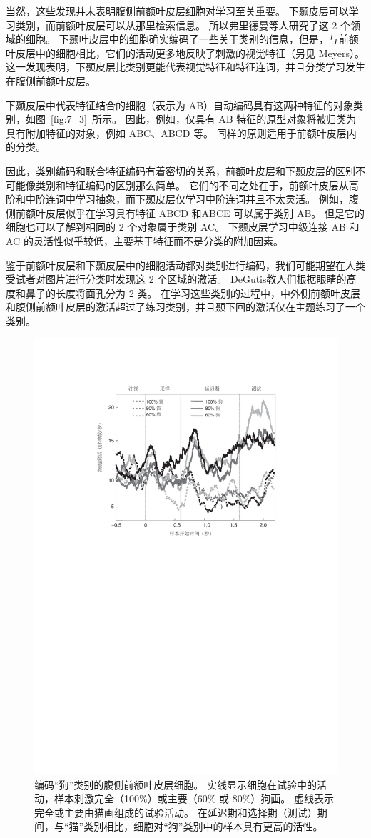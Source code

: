 当然，这些发现并未表明腹侧前额叶皮层细胞对学习至关重要。 
下颞皮层可以学习类别，而前额叶皮层可以从那里检索信息。 
所以弗里德曼等人\cite{freedman2003comparison}研究了这 2 个领域的细胞。 
下颞叶皮层中的细胞确实编码了一些关于类别的信息，但是，与前额叶皮层中的细胞相比，它们的活动更多地反映了刺激的视觉特征（另见 Meyers\cite{meyers2008dynamic}）。 
这一发现表明，下颞皮层比类别更能代表视觉特征和特征连词，并且分类学习发生在腹侧前额叶皮层。
\par

下颞皮层中代表特征结合的细胞（表示为 AB）自动编码具有这两种特征的对象类别，如图~\ref{fig:7_3}~所示。
因此，例如，仅具有 AB 特征的原型对象将被归类为具有附加特征的对象，例如 ABC、ABCD 等。
同样的原则适用于前额叶皮层内的分类。
\par


因此，类别编码和联合特征编码有着密切的关系，前额叶皮层和下颞皮层的区别不可能像类别和特征编码的区别那么简单。 
它们的不同之处在于，前额叶皮层从高阶和中阶连词中学习抽象，而下颞皮层仅学习中阶连词并且不太灵活。
例如，腹侧前额叶皮层似乎在学习具有特征 ABCD 和ABCE 可以属于类别 AB。 
但是它的细胞也可以了解到相同的 2 个对象属于类别 AC。 
下颞皮层学习中级连接 AB 和 AC 的灵活性似乎较低，主要基于特征而不是分类的附加因素。
\par


鉴于前额叶皮层和下颞皮层中的细胞活动都对类别进行编码，我们可能期望在人类受试者对图片进行分类时发现这 2 个区域的激活。 
DeGutis\cite{degutis2009network}教人们根据眼睛的高度和鼻子的长度将面孔分为 2 类。 
在学习这些类别的过程中，中外侧前额叶皮层和腹侧前额叶皮层的激活超过了练习类别，并且颞下回的激活仅在主题练习了一个类别。


\begin{figure}
	\centering
	\includegraphics[width=0.62\linewidth]{chap7/7_6}
	\caption{编码“狗”类别的腹侧前额叶皮层细胞。
		实线显示细胞在试验中的活动，样本刺激完全（100\%）或主要（60\% 或 80\%）狗画。
		虚线表示完全或主要由猫画组成的试验活动。
		在延迟期和选择期（测试）期间，与“猫”类别相比，细胞对“狗”类别中的样本具有更高的活性\cite{freedman2002visual}。\label{fig:7_6}}
\end{figure}
\par


